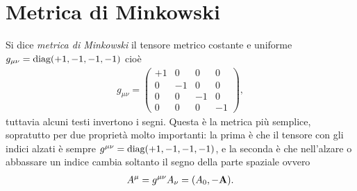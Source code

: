 \section{Metrica di Minkowski}
Si dice \textit{metrica di Minkowski} il tensore metrico costante e uniforme $ g_{\mu \nu} = \textnormal{diag}(+1, -1, -1, -1) $ cioè
\begin{align}
  g_{\mu \nu} = 
  \begin{pmatrix}
    +1 & 0 & 0 & 0 \\
    0 & -1 & 0 & 0 \\
    0 & 0 & -1 & 0 \\
    0 & 0 & 0 & -1
  \end{pmatrix},
\end{align}
tuttavia alcuni testi invertono i segni. Questa è la metrica più semplice, sopratutto per due proprietà molto importanti: la prima è che il tensore con 
gli indici alzati è sempre $ g^{\mu \nu} = \textnormal{diag}(+1, -1, -1, -1) $, e la seconda è che nell'alzare o abbassare un indice cambia soltanto il segno 
della parte spaziale ovvero
\begin{align}
  A^\mu = g^{\mu \nu} A_\nu = (A_0, -\mathbf{A}).
\end{align}

